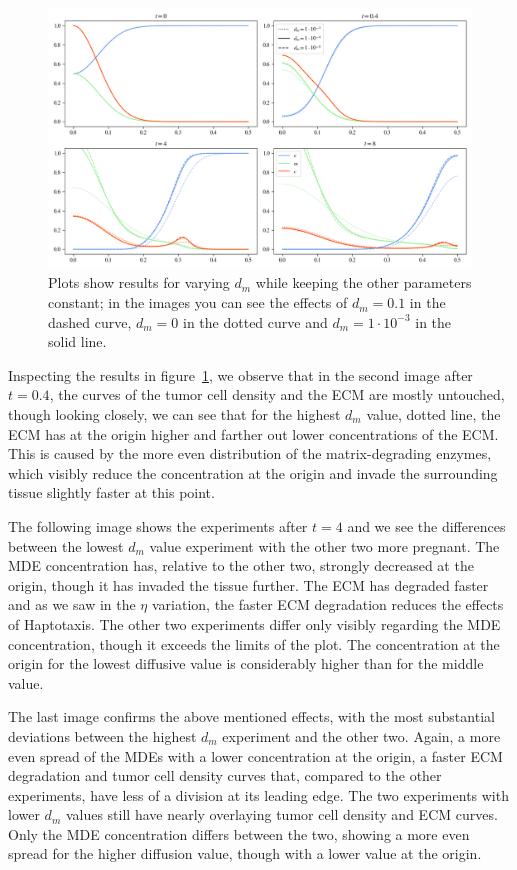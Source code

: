 \begin{figure}[h]
 \centering
 \includegraphics[width=\textwidth]{resources/images/dm_variation.png}
 \caption{Plots show results for varying $d_m$ while keeping the other parameters constant; in the images you can see the effects of $d_m=0.1$ in the dashed curve, $d_m=0$ in the dotted curve and $d_m=1\cdot 10^{-3}$ in the solid line.}
 \label{fig:dm_variation}
\end{figure}
Inspecting the results in figure~\ref{fig:dm_variation}, we observe that in the second image after $t=0.4$, the curves of the tumor cell density and the ECM are mostly untouched, though looking closely, we can see that for the highest $d_m$ value, dotted line, the ECM has at the origin higher and farther out lower concentrations of the ECM. This is caused by the more even distribution of the matrix-degrading enzymes, which visibly reduce the concentration at the origin and invade the surrounding tissue slightly faster at this point.

The following image shows the experiments after $t=4$ and we see the differences between the lowest $d_m$ value experiment with the other two more pregnant. The MDE concentration has, relative to the other two, strongly decreased at the origin, though it has invaded the tissue further. The ECM has degraded faster and as we saw in the $\eta$ variation, the faster ECM degradation reduces the effects of Haptotaxis. The other two experiments differ only visibly regarding the MDE concentration, though it exceeds the limits of the plot. The concentration at the origin for the lowest diffusive value is considerably higher than for the middle value.

The last image confirms the above mentioned effects, with the most substantial deviations between the highest $d_m$ experiment and the other two. Again, a more even spread of the MDEs with a lower concentration at the origin, a faster ECM degradation and tumor cell density curves that, compared to the other experiments, have less of a division at its leading edge. The two experiments with lower $d_m$ values still have nearly overlaying tumor cell density and ECM curves. Only the MDE concentration differs between the two, showing a more even spread for the higher diffusion value, though with a lower value at the origin. 

